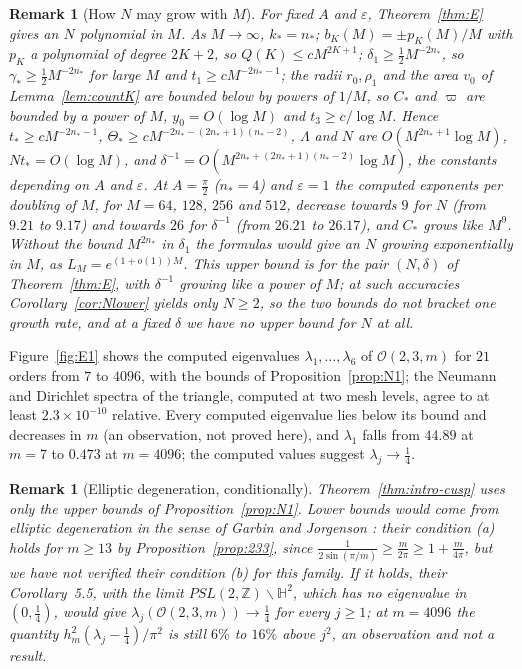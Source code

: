 \documentclass[pdflatex,sn-mathphys-num]{sn-jnl}
\theoremstyle{thmstyleone}%
\theoremstyle{thmstylethree}%
\newtheorem{remark}[theorem]{Remark}%
\newcommand{\Orb}{\mathcal{O}}
\newcommand{\Z}{\mathbb{Z}}
\newcommand{\Hb}{\mathbb{H}^2}
\begin{document}
\begin{remark}[How $N$ may grow with $M$]\label{rem:Mgrowth}
For fixed $A$ and $\varepsilon$, Theorem~\ref{thm:E} gives an $N$ polynomial in $M$. As $M\to\infty$, $k_*=n_*$; $b_K(M)=\pm p_K(M)/M$ with $p_K$ a polynomial of degree $2K+2$, so $Q(K)\le cM^{2K+1}$; $\delta_1\ge\frac12M^{-2n_*}$, so $\gamma_*\ge\frac12M^{-2n_*}$ for large $M$ and $t_1\ge cM^{-2n_*-1}$; the radii $r_0,\rho_1$ and the area $v_0$ of Lemma~\ref{lem:countK} are bounded below by powers of $1/M$, so $C_*$ and $\varpi$ are bounded by a power of $M$, $y_0=O(\log M)$ and $t_3\ge c/\log M$. Hence $t_*\ge cM^{-2n_*-1}$, $\Theta_*\ge cM^{-2n_*-(2n_*+1)(n_*-2)}$, $\Lambda$ and $N$ are $O(M^{2n_*+1}\log M)$, $Nt_*=O(\log M)$, and $\delta^{-1}=O(M^{2n_*+(2n_*+1)(n_*-2)}\log M)$, the constants depending on $A$ and $\varepsilon$. At $A=\frac\pi2$ ($n_*=4$) and $\varepsilon=1$ the computed exponents per doubling of $M$, for $M=64$, $128$, $256$ and $512$, decrease towards $9$ for $N$ (from $9.21$ to $9.17$) and towards $26$ for $\delta^{-1}$ (from $26.21$ to $26.17$), and $C_*$ grows like $M^9$. Without the bound $M^{2n_*}$ in $\delta_1$ the formulas would give an $N$ growing exponentially in $M$, as $L_M=e^{(1+o(1))M}$. This upper bound is for the pair $(N,\delta)$ of Theorem~\ref{thm:E}, with $\delta^{-1}$ growing like a power of $M$; at such accuracies Corollary~\ref{cor:Nlower} yields only $N\ge2$, so the two bounds do not bracket one growth rate, and at a fixed $\delta$ we have no upper bound for $N$ at all.
\end{remark}

Figure~\ref{fig:E1} shows the computed eigenvalues $\lambda_1,\dots,\lambda_6$ of $\Orb(2,3,m)$ for $21$ orders from $7$ to $4096$, with the bounds of Proposition~\ref{prop:N1}; the Neumann and Dirichlet spectra of the triangle, computed at two mesh levels, agree to at least $2.3\times10^{-10}$ relative. Every computed eigenvalue lies below its bound and decreases in $m$ (an observation, not proved here), and $\lambda_1$ falls from $44.89$ at $m=7$ to $0.473$ at $m=4096$; the computed values suggest $\lambda_j\to\frac14$.

\begin{remark}[Elliptic degeneration, conditionally]\label{rem:elliptic}
Theorem~\ref{thm:intro-cusp} uses only the upper bounds of Proposition~\ref{prop:N1}. Lower bounds would come from elliptic degeneration in the sense of Garbin and Jorgenson \cite[\S2]{garbinjorgenson2018}: their condition (a) holds for $m\ge13$ by Proposition~\ref{prop:233}, since $\frac1{2\sin(\pi/m)}\ge\frac m{2\pi}\ge1+\frac m{4\pi}$, but we have not verified their condition (b) for this family. If it holds, their Corollary~5.5, with the limit $PSL(2,\Z)\backslash\Hb$, which has no eigenvalue in $(0,\frac14)$, would give $\lambda_j(\Orb(2,3,m))\to\frac14$ for every $j\ge1$; at $m=4096$ the quantity $h_m^2(\lambda_j-\frac14)/\pi^2$ is still $6\%$ to $16\%$ above $j^2$, an observation and not a result.
\end{remark}
\end{document}

